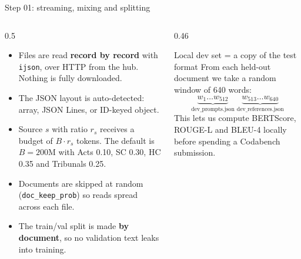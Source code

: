 \documentclass[aspectratio=169,11pt]{beamer}
\newcommand{\code}[1]{\texttt{\small #1}}
\begin{document}
\begin{frame}{Step 01: streaming, mixing and splitting}
  \begin{columns}[T]
    \begin{column}{0.5\textwidth}
      \small
      \begin{itemize}
        \item Files are read \textbf{record by record} with \code{ijson}, over HTTP from the hub.
              Nothing is fully downloaded.
        \item The JSON layout is auto-detected: array, JSON Lines, or ID-keyed object.
        \item Source $s$ with ratio $r_s$ receives a budget of $B\cdot r_s$ tokens.
              The default is $B=200$M with Acts 0.10, SC 0.30, HC 0.35 and Tribunals 0.25.
        \item Documents are skipped at random (\code{doc\_keep\_prob}) so reads spread across each file.
        \item The train/val split is made \textbf{by document}, so no validation text leaks into training.
      \end{itemize}
    \end{column}
    \begin{column}{0.46\textwidth}
      \begin{block}{Local dev set = a copy of the test format}
        \small
        From each held-out document we take a random window of 640 words:
        \[
          \underbrace{w_1\ldots w_{512}}_{\text{dev\_prompts.json}}\;
          \underbrace{w_{513}\ldots w_{640}}_{\text{dev\_references.json}}
        \]
        This lets us compute BERTScore, ROUGE-L and BLEU-4 locally before spending a Codabench submission.
      \end{block}
    \end{column}
  \end{columns}
\end{frame}
\end{document}
